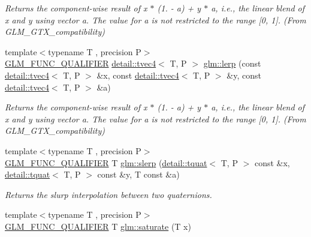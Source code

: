 \begin{DoxyCompactItemize}
\begin{DoxyCompactList}\small\item\em Returns the component-\/wise result of x $\ast$ (1. -\/ a) + y $\ast$ a, i.\+e., the linear blend of x and y using vector a. The value for a is not restricted to the range \mbox{[}0, 1\mbox{]}. (From G\+L\+M\+\_\+\+G\+T\+X\+\_\+compatibility) \end{DoxyCompactList}\item 
{\footnotesize template$<$typename T , precision P$>$ }\\\hyperlink{setup_8hpp_a33fdea6f91c5f834105f7415e2a64407}{G\+L\+M\+\_\+\+F\+U\+N\+C\+\_\+\+Q\+U\+A\+L\+I\+F\+I\+ER} \hyperlink{structglm_1_1detail_1_1tvec4}{detail\+::tvec4}$<$ T, P $>$ \hyperlink{group__gtx__compatibility_ga48f60aeee275f1848cfc60a85fde96f2}{glm\+::lerp} (const \hyperlink{structglm_1_1detail_1_1tvec4}{detail\+::tvec4}$<$ T, P $>$ \&x, const \hyperlink{structglm_1_1detail_1_1tvec4}{detail\+::tvec4}$<$ T, P $>$ \&y, const \hyperlink{structglm_1_1detail_1_1tvec4}{detail\+::tvec4}$<$ T, P $>$ \&a)
\begin{DoxyCompactList}\small\item\em Returns the component-\/wise result of x $\ast$ (1. -\/ a) + y $\ast$ a, i.\+e., the linear blend of x and y using vector a. The value for a is not restricted to the range \mbox{[}0, 1\mbox{]}. (From G\+L\+M\+\_\+\+G\+T\+X\+\_\+compatibility) \end{DoxyCompactList}\item 
{\footnotesize template$<$typename T , precision P$>$ }\\\hyperlink{setup_8hpp_a33fdea6f91c5f834105f7415e2a64407}{G\+L\+M\+\_\+\+F\+U\+N\+C\+\_\+\+Q\+U\+A\+L\+I\+F\+I\+ER} T \hyperlink{group__gtx__compatibility_gaa47df8c302c9b42c813da3f658f90e1a}{glm\+::slerp} (\hyperlink{structglm_1_1detail_1_1tquat}{detail\+::tquat}$<$ T, P $>$ const \&x, \hyperlink{structglm_1_1detail_1_1tquat}{detail\+::tquat}$<$ T, P $>$ const \&y, T const \&a)
\begin{DoxyCompactList}\small\item\em Returns the slurp interpolation between two quaternions. \end{DoxyCompactList}\item 
{\footnotesize template$<$typename T , precision P$>$ }\\\hyperlink{setup_8hpp_a33fdea6f91c5f834105f7415e2a64407}{G\+L\+M\+\_\+\+F\+U\+N\+C\+\_\+\+Q\+U\+A\+L\+I\+F\+I\+ER} T \hyperlink{group__gtx__compatibility_ga0fd09e616d122bc2ed9726682ffd44b7}{glm\+::saturate} (T x)

\end{DoxyCompactItemize}
